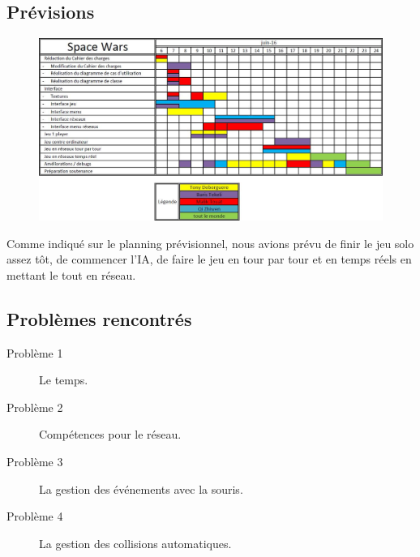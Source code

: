 \documentclass[french, 11pt]{report}
\begin{document}
			\subsection{Prévisions}
				\begin{figure}[h]
					\centering	
					\includegraphics[width=1.05\linewidth]{PlanningPrevisionnel}
				\end{figure}		
				Comme indiqué sur le planning prévisionnel, nous avions prévu de finir le jeu solo assez tôt, de commencer l'IA, de faire le jeu en tour par tour et en temps réels en mettant le tout en réseau.
			\subsection{Problèmes rencontrés}
				\begin{description}
					\item[Problème 1] Le temps.
					\item[Problème 2] Compétences pour le réseau.
					\item[Problème 3] La gestion des événements avec la souris.
					\item[Problème 4] La gestion des collisions automatiques.
				\end{description}
\end{document}
